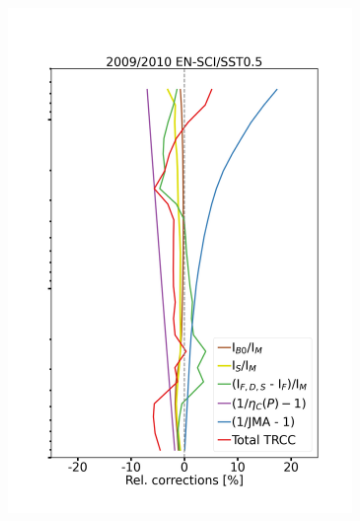 \documentclass{article}
\begin{document}
\begin{figure}
\begin{subfigure}[t]{0.27\textwidth}
            \includegraphics[width=\linewidth]{png/v7_relative_corrections_unc__sm_hv_0910_TRRM_EN0505}
        \end{subfigure}
        \hspace{-5.3mm}
        \begin{subfigure}[t]{0.27\textwidth}

\end{subfigure}
\end{figure}
\end{document}
